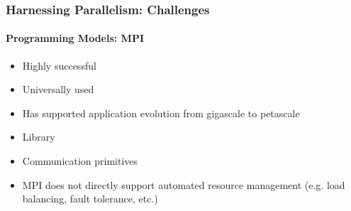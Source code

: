 \begin{frame}[t]
\frametitle{Harnessing Parallelism: Challenges}
\framesubtitle{Programming Models: MPI}
  \begin{itemize}
    \item Highly successful
    \item Universally used
    \item Has supported application evolution from gigascale to petascale
  \end{itemize}
  \begin{itemize}
    \item Library
    \item Communication primitives
  \end{itemize}
  \begin{itemize}
    \item MPI does not directly support automated resource management
      (e.g. load balancing, fault tolerance, etc.)
  \end{itemize}
\end{frame}



%     


%     


